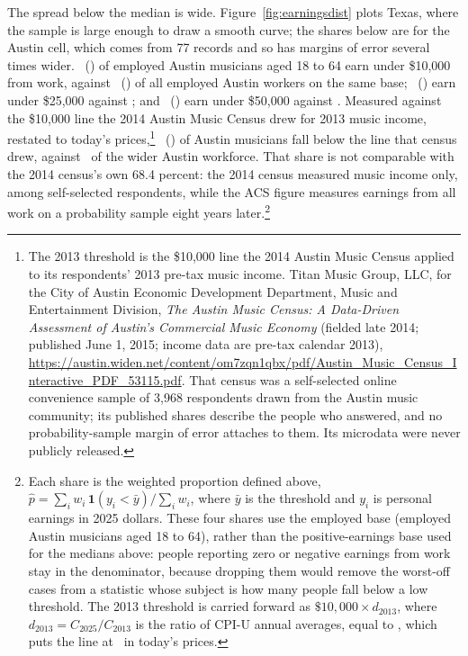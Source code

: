 The spread below the median is wide. Figure~\ref{fig:earningsdist} plots
Texas, where the sample is large enough to draw a smooth curve; the shares
below are for the Austin cell, which comes from 77 records and so has
margins of error several times wider.
\NPumsAustinMusLtOneZerok\ (\NPumsAustinMusLtOneZerokMoe) of employed Austin
musicians aged 18 to 64 earn under \$10,000 from work, against
\NPumsAustinAllworkLtOneZerok\ (\NPumsAustinAllworkLtOneZerokMoe) of all
employed Austin workers on the same base;
\NPumsAustinMusLtTwoFivek\ (\NPumsAustinMusLtTwoFivekMoe) earn under
\$25,000 against \NPumsAustinAllworkLtTwoFivek; and
\NPumsAustinMusLtFiveZerok\ (\NPumsAustinMusLtFiveZerokMoe) earn under
\$50,000 against \NPumsAustinAllworkLtFiveZerok. Measured against the
\$10,000 line the 2014 Austin Music Census drew for 2013 music income,
restated to today's prices,\footnote{The 2013 threshold is the \$10,000 line the
2014 Austin Music Census applied to its respondents' 2013 pre-tax music
income. Titan Music Group, LLC, for the City of Austin Economic Development
Department, Music and Entertainment Division, \textit{The Austin Music
Census: A Data-Driven Assessment of Austin's Commercial Music Economy}
(fielded late 2014; published June 1, 2015; income data are pre-tax calendar
2013), \url{https://austin.widen.net/content/om7zqn1qbx/pdf/Austin_Music_Census_Interactive_PDF_53115.pdf}.
That census was a self-selected online convenience sample of 3,968
respondents drawn from the Austin music community; its published shares
describe the people who answered, and no probability-sample margin of error
attaches to them. Its microdata were never publicly released.}
\NPumsAustinMusLtmusiccensus\ (\NPumsAustinMusLtmusiccensusMoe) of Austin
musicians fall below the line that census drew, against
\NPumsAustinAllworkLtmusiccensus\ of the wider Austin workforce. That share
is not comparable with the 2014 census's own 68.4 percent: the 2014 census
measured music income only, among self-selected respondents, while the ACS
figure measures earnings from all work on a probability sample eight years
later.\footnote{Each share is the weighted proportion defined above,
\(\hat p = \sum_i w_i\,\mathbf{1}(y_i < \bar y)\big/\sum_i w_i\), where
\(\bar y\) is the threshold and \(y_i\) is personal earnings in 2025 dollars.
These four shares use the employed base (employed Austin musicians aged 18
to 64), rather than the positive-earnings base used for the medians above:
people reporting zero or negative earnings from work stay in the
denominator, because dropping them would remove the worst-off cases from a
statistic whose subject is how many people fall below a low threshold. The
2013 threshold is carried forward as
\(\$10{,}000 \times d_{2013}\), where \(d_{2013} = C_{2025}/C_{2013}\) is the
ratio of CPI-U annual averages, equal to
\NPumsDeflTwoZeroOneThreeToTwoZeroTwoFive, which puts the line at
\NPumsMusiccensusTenkTwoZeroTwoFiveusd\ in today's prices.}

